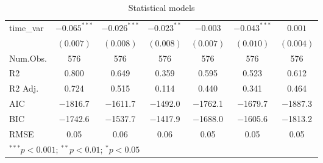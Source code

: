 \begin{table}
\begin{center}
\begin{tabular}{l c c c c c c}
time\_var             & $-0.065^{***}$ & $-0.026^{***}$ & $-0.023^{**}$ & $-0.003$       & $-0.043^{***}$ & $0.001$       \\
                      & $(0.007)$      & $(0.008)$      & $(0.008)$     & $(0.007)$      & $(0.010)$      & $(0.004)$     \\
\hline
\midrule
Num.Obs. & \num{576} & \num{576} & \num{576} & \num{576} & \num{576} & \num{576}\\
R2 & \num{0.800} & \num{0.649} & \num{0.359} & \num{0.595} & \num{0.523} & \num{0.612}\\
R2 Adj. & \num{0.724} & \num{0.515} & \num{0.114} & \num{0.440} & \num{0.341} & \num{0.464}\\
AIC & \num{-1816.7} & \num{-1611.7} & \num{-1492.0} & \num{-1762.1} & \num{-1679.7} & \num{-1887.3}\\
BIC & \num{-1742.6} & \num{-1537.7} & \num{-1417.9} & \num{-1688.0} & \num{-1605.6} & \num{-1813.2}\\
RMSE & \num{0.05} & \num{0.06} & \num{0.06} & \num{0.05} & \num{0.05} & \num{0.05}\\
\bottomrule
\multicolumn{7}{l}{\scriptsize{$^{***}p<0.001$; $^{**}p<0.01$; $^{*}p<0.05$}}
\end{tabular}
\caption{Statistical models}
\label{table:FE_RQ2_Log}
\end{center}
\end{table}